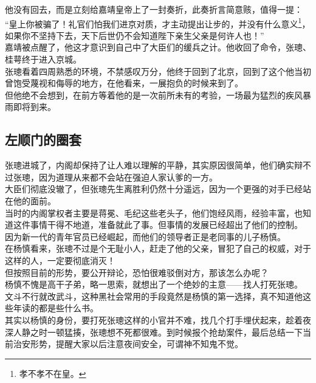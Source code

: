 \begin{multicols}{\theparacolNo}
他没有回去，而是立刻给嘉靖皇帝上了一封奏折，此奏折言简意赅，值得一提：\\

“皇上你被骗了！礼官们怕我们进京对质，才主动提出让步的，并没有什么意义\footnote{孝不孝不在皇。}，如果你不坚持下去，天下后世仍不会知道陛下亲生父亲是何许人也！”\\

嘉靖被点醒了，他这才意识到自己中了大臣们的缓兵之计。他收回了命令，张璁、桂萼终于进入京城。\\

张璁看着四周熟悉的环境，不禁感叹万分，他终于回到了北京，回到了这个他当初曾饱受蔑视和侮辱的地方，在他看来，一展抱负的时候来到了。\\

但他绝不会想到，在前方等着他的是一次前所未有的考验，一场最为猛烈的疾风暴雨即将到来。\\

\subsection{左顺门的圈套}
张璁进城了，内阁却保持了让人难以理解的平静，其实原因很简单，他们确实辩不过张璁，因为道理从来都不会站在强迫人家认爹的一方。\\

大臣们彻底没辙了，但张璁先生离胜利仍然十分遥远，因为一个更强的对手已经站在他的面前。\\

当时的内阁掌权者主要是蒋冕、毛纪这些老头子，他们饱经风雨，经验丰富，也知道这件事情干得不地道，准备就此了事。但事情的发展已经超出了他们的控制。\\

因为新一代的青年官员已经崛起，而他们的领导者正是老同事的儿子杨慎。\\

在杨慎看来，张璁不过是个无耻小人，赶走了他的父亲，冒犯了自己的权威，对于这样的人，一定要彻底消灭！\\

但按照目前的形势，要公开辩论，恐怕很难驳倒对方，那该怎么办呢？\\

杨慎不愧是高干子弟，略一思索，就想出了一个绝妙的主意——找人打死张璁。\\

文斗不行就改武斗，这种黑社会常用的手段竟然是杨慎的第一选择，真不知道他这些年读的都是些什么书。\\

其实以杨慎的身份，要打死张璁这样的小官并不难，找几个打手埋伏起来，趁着夜深人静之时一顿猛揍，张璁想不死都很难。到时候报个抢劫案件，最后总结一下当前治安形势，提醒大家以后注意夜间安全，可谓神不知鬼不觉。\\


\end{multicols}
